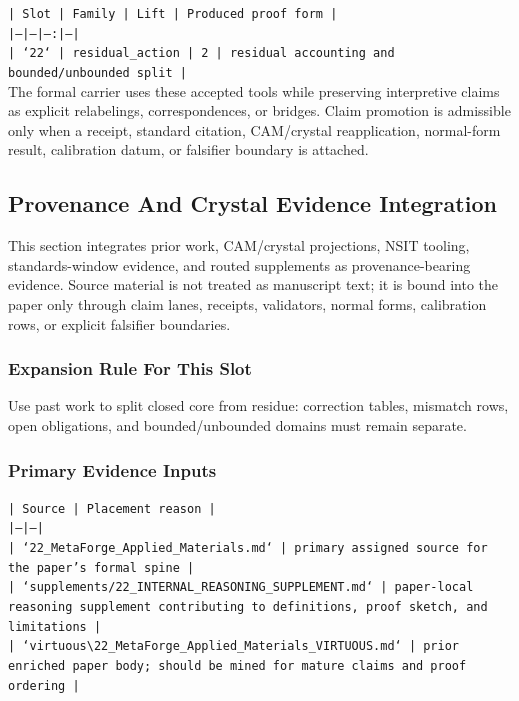 \documentclass[11pt]{article}
\begin{document}
\noindent\texttt{| Slot | Family | Lift | Produced proof form |}\\
\noindent\texttt{|---|---|---:|---|}\\
\noindent\texttt{| `22` | residual\_action | 2 | residual accounting and bounded/unbounded split |}\\

The formal carrier uses these accepted tools while preserving interpretive
claims as explicit relabelings, correspondences, or bridges. Claim promotion is admissible only when a receipt, standard citation,
CAM/crystal reapplication, normal-form result, calibration datum, or falsifier
boundary is attached.

\subsection*{Provenance And Crystal Evidence Integration}

This section integrates prior work, CAM/crystal projections, NSIT tooling,
standards-window evidence, and routed supplements as provenance-bearing
evidence. Source material is not treated as manuscript text; it is bound into
the paper only through claim lanes, receipts, validators, normal forms,
calibration rows, or explicit falsifier boundaries.

\subsubsection*{Expansion Rule For This Slot}

Use past work to split closed core from residue: correction tables, mismatch rows, open obligations, and bounded/unbounded domains must remain separate.

\subsubsection*{Primary Evidence Inputs}

\noindent\texttt{| Source | Placement reason |}\\
\noindent\texttt{|---|---|}\\
\noindent\texttt{| `22\_MetaForge\_Applied\_Materials.md` | primary assigned source for the paper's formal spine |}\\
\noindent\texttt{| `supplements/22\_INTERNAL\_REASONING\_SUPPLEMENT.md` | paper-local reasoning supplement contributing to definitions, proof sketch, and limitations |}\\
\noindent\texttt{| `virtuous\textbackslash{}22\_MetaForge\_Applied\_Materials\_VIRTUOUS.md` | prior enriched paper body; should be mined for mature claims and proof ordering |}\\
\end{document}
